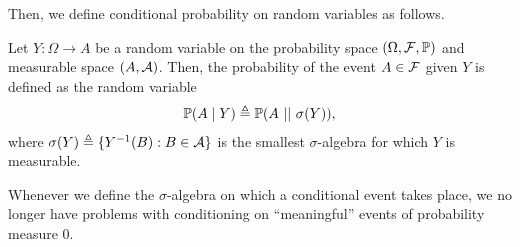 Then, we define conditional probability on random variables as follows.
%
\begin{definition} \label{def:cond_prob_rv}
    Let $Y:\Omega\longrightarrow A$ be a random variable on the probability space $(\Omega,\cal{F},\P)$ and measurable space $(A,\cal{A})$.
    Then, the probability of the event $A\in\cal{F}$ given $Y$ is defined as the random variable
    \begin{align*}
        \P(A \mid Y) \triangleq \P(A ~||~ \sigma(Y)),
    \end{align*}
    where $\sigma(Y) \triangleq \{Y^{-1}(B): B\in\cal{A}\}$ is the smallest $\sigma$-algebra for which $Y$ is measurable.
\end{definition}

Whenever we define the $\sigma$-algebra on which a conditional event takes place, we no longer have problems with conditioning on ``meaningful'' events of probability measure $0$.


